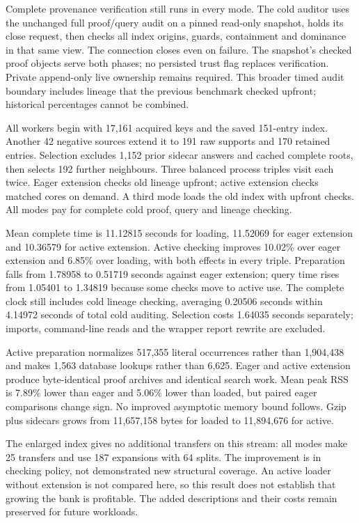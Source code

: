 \documentclass[11pt,a4paper]{article}
\numberwithin{equation}{section}
\theoremstyle{plain}
\theoremstyle{definition}
\theoremstyle{remark}
\begin{document}
Complete provenance verification still runs in every mode. The cold auditor
uses the unchanged full proof/query audit on a pinned read-only snapshot, holds
its close request, then checks all index origins, guards, containment and
dominance in that same view. The connection closes even on failure. The
snapshot's checked proof objects serve both phases; no persisted trust flag
replaces verification. Private append-only live ownership remains required.
This broader timed audit boundary includes lineage that the previous benchmark
checked upfront; historical percentages cannot be combined.

All workers begin with 17,161 acquired keys and the saved 151-entry index.
Another 42 negative sources extend it to 191 raw supports and 170 retained
entries. Selection excludes 1,152 prior sidecar answers and cached complete
roots, then selects 192 further neighbours. Three balanced process triples
visit each twice. Eager extension checks old lineage upfront; active extension
checks matched cores on demand. A third mode loads the old index with upfront
checks. All modes pay for complete cold proof, query and lineage checking.

Mean complete time is 11.12815 seconds for loading, 11.52069 for eager extension
and 10.36579 for active extension. Active checking improves 10.02\% over eager
extension and 6.85\% over loading, with both effects in every triple. Preparation
falls from 1.78958 to 0.51719 seconds against eager extension; query time rises
from 1.05401 to 1.34819 because some checks move to active use. The complete
clock still includes cold lineage checking, averaging 0.20506 seconds within
4.14972 seconds of total cold auditing. Selection costs 1.64035 seconds separately;
imports, command-line reads and the wrapper report rewrite are excluded.

Active preparation normalizes 517,355 literal occurrences rather than 1,904,438
and makes 1,563 database lookups rather than 6,625. Eager and active extension
produce byte-identical proof archives and identical search work. Mean peak RSS
is 7.89\% lower than eager and 5.06\% lower than loaded, but paired eager
comparisons change sign. No improved asymptotic memory bound follows. Gzip plus
sidecars grows from 11,657,158 bytes for loaded to 11,894,676 for active.

The enlarged index gives no additional transfers on this stream: all modes
make 25 transfers and use 187 expansions with 64 splits. The improvement is in
checking policy, not demonstrated new structural coverage. An active loader
without extension is not compared here, so this result does not establish
that growing the bank is profitable. The added descriptions and their costs
remain preserved for future workloads.
\end{document}
